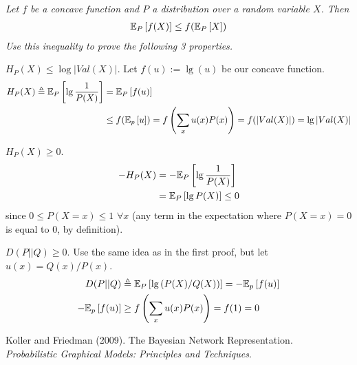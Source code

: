 \documentclass[11pt]{article}
\begin{document}
\begin{example}
	\textit{Let $f$ be a concave function and $P$ a distribution over a random variable $X$. Then 
		\begin{align}
			\E[P]{f(X)} \le f(\E[P]{X})
		\end{align}
	Use this inequality to prove the following 3 properties.}
	\tcblower 
	\begin{compactitem}
		\item $H_P(X) \le \log| Val(X) |$. Let $f(u) := \lg(u)$ be our concave function.
		\begin{align}
			H_P(X) \triangleq \E[P]{\lg \inv{P(X)}} &= \E[P]{f(u)} \\
			&\le f(\E[p]{u})  = f\left(\sum_x u(x) P(x)\right) = f(|Val(X)|) = \lg|Val(X)| \\
		\end{align}

		
		\item $H_P(X) \ge 0$. 
		\begin{align}
			-H_P(X) &= - \E[P]{\lg\inv{P(X)}} \\
					&= \E[P]{\lg P(X)} \le 0
		\end{align}
		since $0 \le P(X=x) \le 1$ $\forall x$ (any term in the expectation where $P(X=x) = 0$ is equal to $0$, by definition). 
		
		\item $D(P || Q) \ge 0$. Use the same idea as in the first proof, but let $u(x) = Q(x)/P(x)$. 
		\begin{align}
			D(P || Q) &\triangleq \E[P]{\lg \left( P(X) / Q(X) \right)} = - \E[p]{f(u)} \\
			- \E[p]{f(u)} &\ge f  \left( \sum_x u(x) P(x) \right) = f(1) = 0
		\end{align}
	\end{compactitem}
\end{example}





\vspace{-1.7em}
{\scriptsize Koller and Friedman (2009). The Bayesian Network Representation.\\ \textit{Probabilistic Graphical Models: Principles and Techniques}.\\ }
\end{document}
